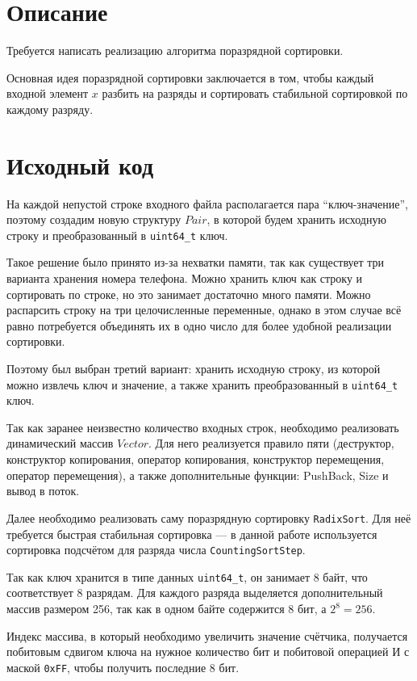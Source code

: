 \section{Описание}

Требуется написать реализацию алгоритма поразрядной сортировки.

Основная идея поразрядной сортировки заключается в том, чтобы каждый входной элемент $x$ разбить на разряды и сортировать стабильной сортировкой по каждому разряду.

\pagebreak

\section{Исходный код}

На каждой непустой строке входного файла располагается пара \enquote{ключ-значение}, поэтому создадим новую структуру $Pair$, в которой будем хранить исходную строку и преобразованный в \texttt{uint64\_t} ключ.

Такое решение было принято из-за нехватки памяти, так как существует три варианта хранения номера телефона. Можно хранить ключ как строку и сортировать по строке, но это занимает достаточно много памяти. Можно распарсить строку на три целочисленные переменные, однако в этом случае всё равно потребуется объединять их в одно число для более удобной реализации сортировки.

Поэтому был выбран третий вариант: хранить исходную строку, из которой можно извлечь ключ и значение, а также хранить преобразованный в \texttt{uint64\_t} ключ.

Так как заранее неизвестно количество входных строк, необходимо реализовать динамический массив $Vector$. Для него реализуется правило пяти (деструктор, конструктор копирования, оператор копирования, конструктор перемещения, оператор перемещения), а также дополнительные функции: PushBack, Size и вывод в поток.

Далее необходимо реализовать саму поразрядную сортировку \texttt{RadixSort}. Для неё требуется быстрая стабильная сортировка — в данной работе используется сортировка подсчётом для разряда числа \texttt{CountingSortStep}.

Так как ключ хранится в типе данных \texttt{uint64\_t}, он занимает 8 байт, что соответствует 8 разрядам. Для каждого разряда выделяется дополнительный массив размером 256, так как в одном байте содержится 8 бит, а $2^8 = 256$.

Индекс массива, в который необходимо увеличить значение счётчика, получается побитовым сдвигом ключа на нужное количество бит и побитовой операцией И с маской \texttt{0xFF}, чтобы получить последние 8 бит.

